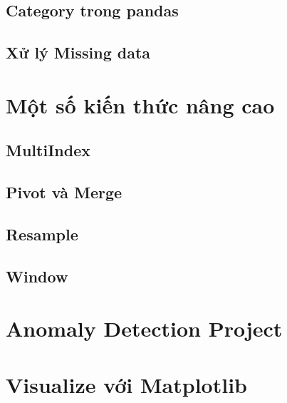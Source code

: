 \documentclass[
]{book}
\begin{document}
\section{Category trong pandas}\label{category-trong-pandas}

\section{Xử lý Missing data}\label{xux1eed-luxfd-missing-data}

\chapter{Một số kiến thức nâng cao}\label{mux1ed9t-sux1ed1-kiux1ebfn-thux1ee9c-nuxe2ng-cao}

\section{MultiIndex}\label{multiindex}

\section{Pivot và Merge}\label{pivot-vuxe0-merge}

\section{Resample}\label{resample}

\section{Window}\label{window}

\chapter{Anomaly Detection Project}\label{anomaly-detection-project}

\chapter{Visualize với Matplotlib}\label{visualize-vux1edbi-matplotlib}

\printindex
\end{document}
